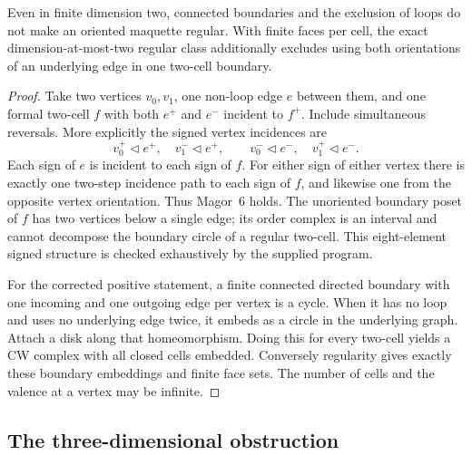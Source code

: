 \begin{counterexample}
\label{SA21-C05}
Even in finite dimension two, connected boundaries and the exclusion
of loops do not make an oriented maquette regular. With finite faces
per cell, the exact dimension-at-most-two regular class additionally
excludes using both orientations of an underlying edge in one two-cell
boundary.
\end{counterexample}
\begin{proof}
Take two vertices $v_0,v_1$, one non-loop edge $e$ between them,
and one formal two-cell $f$ with both $e^+$ and $e^-$ incident to
$f^+$. Include simultaneous reversals. More explicitly the signed
vertex incidences are
\[
 v_0^+\triangleleft e^+,\quad v_1^-\triangleleft e^+,
 \qquad
 v_0^-\triangleleft e^-,\quad v_1^+\triangleleft e^-.
\]
Each sign of $e$ is incident to each sign of $f$. For either sign of
either vertex there is exactly one two-step incidence path to each
sign of $f$, and likewise one from the opposite vertex orientation.
Thus Magor~6 holds. The unoriented boundary poset of $f$ has two
vertices below a single edge; its order complex is an interval and
cannot decompose the boundary circle of a regular two-cell. This
eight-element signed structure is checked exhaustively by the supplied
program.

For the corrected positive statement, a finite connected directed
boundary with one incoming and one outgoing edge per vertex is a cycle.
When it has no loop and uses no underlying edge twice, it embeds as a
circle in the underlying graph. Attach a disk along that homeomorphism.
Doing this for every two-cell yields a CW complex with all closed cells
embedded. Conversely regularity gives exactly these boundary embeddings
and finite face sets. The number of cells and the valence at a vertex
may be infinite.
\end{proof}

\subsection{The three-dimensional obstruction}

